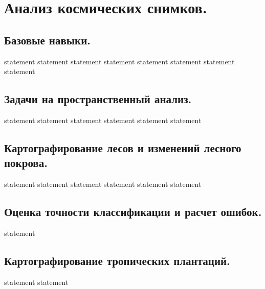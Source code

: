 \chapter{Анализ космических снимков.}

\section{Базовые навыки.}

{statement}
{statement}
{statement}
{statement}
{statement}
{statement}
{statement}
{statement}

\section{Задачи на пространственный анализ.}

{statement}
{statement}
{statement}
{statement}
{statement}
{statement}

\section{Картографирование лесов и изменений лесного покрова.}

{statement}
{statement}
{statement}
{statement}
{statement}
{statement}

\section{Оценка точности классификации и расчет ошибок.}

{statement}

\section{Картографирование тропических плантаций.}

{statement}
{statement}